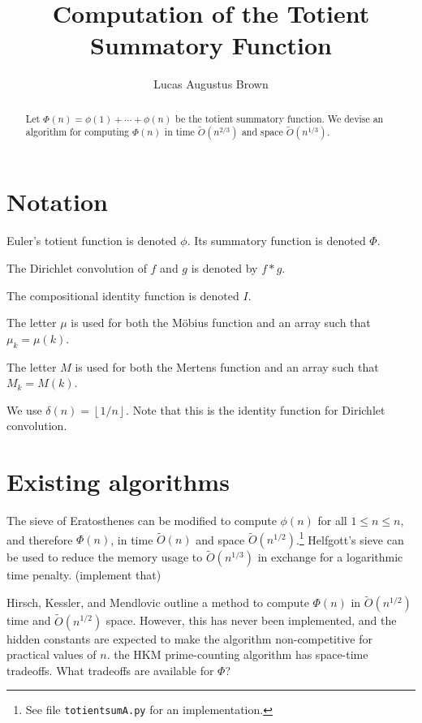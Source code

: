\documentclass[12pt]{article}
\title{Computation of the Totient Summatory Function}
\author{Lucas Augustus Brown \orcidlink{0000-0002-6000-3735}}
\date{\currentdatetime}
\newcommand{\floor}[1]{{\left\lfloor #1 \right\rfloor}}
\newcommand{\softO}[0]{\widetilde{O}}
\begin{document}
\maketitle %

\begin{abstract}
Let $\Phi(n) = \phi(1) + \cdots + \phi(n)$ be the totient summatory function.  We devise an algorithm for computing $\Phi(n)$ in time $\softO(n^{2/3})$ and space $\softO(n^{1/3})$.
\end{abstract}

\section{Notation}

Euler's totient function is denoted $\phi$.  Its summatory function is denoted $\Phi$.

The Dirichlet convolution of $f$ and $g$ is denoted by $f*g$.

The compositional identity function is denoted $I$.

The letter $\mu$ is used for both the M\"{o}bius function and an array such that $\mu_k = \mu(k)$.

The letter $M$ is used for both the Mertens function and an array such that $M_k = M(k)$.

We use $\delta(n) = \floor{1/n}$.  Note that this is the identity function for Dirichlet convolution.

\section{Existing algorithms}

The sieve of Eratosthenes can be modified to compute $\phi(n)$ for all $1 \leq n \leq n$, and therefore $\Phi(n)$, in time $\softO(n)$ and space $\softO(n^{1/2})$.\footnote{See file \texttt{totientsumA.py} for an implementation.}  Helfgott's sieve \cite{Helfgott2020} can be used to reduce the memory usage to $\softO(n^{1/3})$ in exchange for a logarithmic time penalty.  (\todo implement that)

Hirsch, Kessler, and Mendlovic outline \cite[\S5.6]{HKM2024} a method to compute $\Phi(n)$ in $\softO(n^{1/2})$ time and $\softO(n^{1/2})$ space.  However, this has never been implemented, and the hidden constants are expected to make the algorithm non-competitive for practical values of $n$.  \todo the HKM prime-counting algorithm has space-time tradeoffs.  What tradeoffs are available for $\Phi$?
\end{document}
